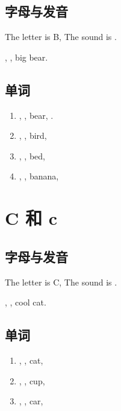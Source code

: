 \subsection{字母与发音}

The letter is B, The sound is .

, , big bear.


\subsection{单词}

\begin{enumerate}
  \item {}, , bear, .
  \item {}, , bird, 
  \item {}, , bed, 
  \item {}, , banana, 
\end{enumerate}




\section{C 和 c}

\subsection{字母与发音}

The letter is C, The sound is .

, , cool cat.

\subsection{单词}

\begin{enumerate}
  \item {}, , cat, 
  \item {}, , cup, 
  \item {}, , car, 
\end{enumerate}

